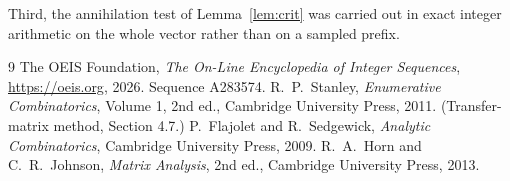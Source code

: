 \documentclass[11pt,a4paper]{article}
\theoremstyle{plain}
\theoremstyle{definition}
\begin{document}
Third, the annihilation test of Lemma~\ref{lem:crit} was carried out in exact integer
arithmetic on the whole vector rather than on a sampled prefix.

\begin{thebibliography}{9}
 The OEIS Foundation, \emph{The On-Line Encyclopedia of Integer
Sequences}, \url{https://oeis.org}, 2026. Sequence A283574.
 R.~P.~Stanley, \emph{Enumerative Combinatorics}, Volume 1, 2nd ed.,
Cambridge University Press, 2011. (Transfer-matrix method, Section 4.7.)
 P.~Flajolet and R.~Sedgewick, \emph{Analytic Combinatorics}, Cambridge
University Press, 2009.
 R.~A.~Horn and C.~R.~Johnson, \emph{Matrix Analysis}, 2nd ed., Cambridge
University Press, 2013.
\end{thebibliography}
\end{document}
